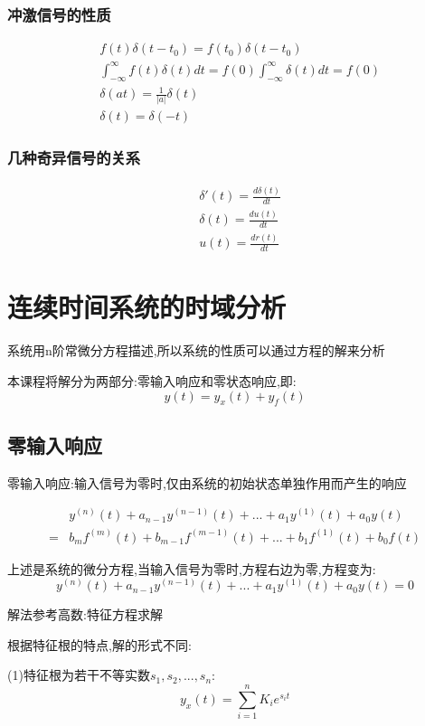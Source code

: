 \documentclass[12pt, a4paper, oneside]{ctexart}
\begin{document}
\subsubsection{冲激信号的性质}
\begin{align*}
    &f(t)\delta(t-t_0)=f(t_0)\delta(t-t_0)\\
    &\int_{-\infty}^{\infty}f(t)\delta(t)dt=f(0)\int_{-\infty}^{\infty}\delta(t)dt=f(0)\\
    &\delta(at)=\frac{1}{|a|}\delta(t)\\
    &\delta(t)=\delta(-t)
\end{align*}

\subsubsection{几种奇异信号的关系}
\begin{align*}
    &\delta'(t)=\frac{d\delta(t)}{dt}\\
    &\delta(t)=\frac{du(t)}{dt}\\
    &u(t)=\frac{dr(t)}{dt}
\end{align*}

\section{连续时间系统的时域分析}
系统用n阶常微分方程描述,所以系统的性质可以通过方程的解来分析

本课程将解分为两部分:零输入响应和零状态响应,即:
\[
    y(t)=y_x(t)+y_f(t)
\]

\subsection{零输入响应}
零输入响应:输入信号为零时,仅由系统的初始状态单独作用而产生的响应

\begin{align*}
    &y^{(n)}(t)+a_{n-1}y^{(n-1)}(t)+...+a_1y^{(1)}(t)+a_0y(t)\\
    = &b_mf^{(m)}(t)+b_{m-1}f^{(m-1)}(t)+...+b_1f^{(1)}(t)+b_0f(t)
\end{align*}

上述是系统的微分方程,当输入信号为零时,方程右边为零,方程变为:
\[
    y^{(n)}(t)+a_{n-1}y^{(n-1)}(t)+...+a_1y^{(1)}(t)+a_0y(t)=0
\]

解法参考高数:特征方程求解

根据特征根的特点,解的形式不同:

(1)特征根为若干不等实数$s_1,s_2,...,s_n$:
\[
    y_x(t)=\sum_{i=1}^{n}K_ie^{s_i t}
\]
\end{document}

